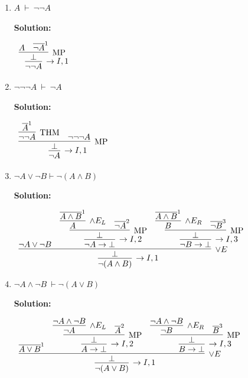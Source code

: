 \documentclass[11pt]{report}
\newcommand{\temp}[2]{{\overline{#2}}^{#1}}
\begin{document}
\begin{enumerate}
\begin{enumerate}
		\item $A \ \vdash \ \lnot\lnot A$
		
		\textbf{Solution:}

		\begin{center}
			$\begin{array}{c}
				\infer[\to I, 1]{\lnot \lnot A}
					{\infer[\MP]{\bot}
						{A
						&
						\temp{1}{\lnot A}}}
			\end{array}$
		\end{center}

		\item $\lnot \lnot \lnot A \ \vdash \ \lnot A$
		
		\textbf{Solution:}

		\begin{center}
			$\begin{array}{c}
				\infer[\to I, 1]{\lnot A}
					{\infer[\MP]{\bot}
						{\infer[\THM]{\lnot \lnot A}{\temp{1}{A}}
						&
						\lnot \lnot \lnot A}}
			\end{array}$
		\end{center}

		\item $\lnot A \lor \lnot B \vdash \lnot(A \land B)$
		
		\textbf{Solution:}

		\begin{center}
			$\begin{array}{c}
				\infer[\to I, 1]{\lnot (A \land B)}
					{\infer[\lor E]{\bot}
						{\lnot A \lor \lnot B
						&
						\infer[\to I, 2]{\lnot A \to \bot}
							{\infer[\MP]{\bot}
								{\infer[\land E_{L}]{A}{\temp{1}{A \land B}}
								&
								\temp{2}{\lnot A}}}
						&
						\infer[\to I, 3]{\lnot B \to \bot}
							{\infer[\MP]{\bot}
								{\infer[\land E_{R}]{B}{\temp{1}{A \land B}}
								&
								\temp{3}{\lnot B}}}}}
			\end{array}$
		\end{center}

		\item $\lnot A \land \lnot B \ \vdash \lnot(A \lor B)$
		
		\textbf{Solution:}

		\begin{center}
			$\begin{array}{c}
				\infer[\to I, 1]{\lnot(A \lor B)}
					{\infer[\lor E]{\bot}
						{\temp{1}{A \lor B}
						&
						\infer[\to I, 2]{A \to \bot}
							{\infer[\MP]{\bot}
								{\infer[\land E_{L}]{\lnot A}
									{\lnot A \land \lnot B}
								&
								\temp{2}{A}}}
						&
						\infer[\to I, 3]{B \to \bot}
							{\infer[\MP]{\bot}
								{\infer[\land E_{R}]{\lnot B}
									{\lnot A \land \lnot B}
								&
								\temp{3}{B}}}}}
			\end{array}$
		\end{center}


\end{enumerate}
\end{enumerate}
\end{document}
